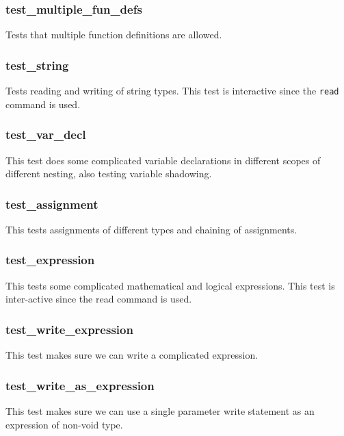 \documentclass{report}
\begin{document}
\subsubsection*{test\_multiple\_fun\_defs}

Tests that multiple function definitions are allowed.

\subsubsection*{test\_string}

Tests reading and writing of string types. This test is interactive
since the \texttt{read} command is used.

\subsubsection*{test\_var\_decl}

This test does some complicated variable declarations in different
scopes of different nesting, also testing variable shadowing.

\subsubsection*{test\_assignment}

This tests assignments of different types and chaining of
assignments.

\subsubsection*{test\_expression}

This tests some complicated mathematical and logical expressions.
This test is inter-active since the read command is used.

\subsubsection*{test\_write\_expression}

This test makes sure we can write a complicated expression.

\subsubsection*{test\_write\_as\_expression}

This test makes sure we can use a single parameter write statement
as an expression of non-void type.
\end{document}
